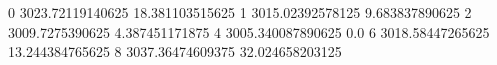 0 3023.72119140625 18.381103515625
1 3015.02392578125 9.683837890625
2 3009.7275390625 4.387451171875
4 3005.340087890625 0.0
6 3018.58447265625 13.244384765625
8 3037.36474609375 32.024658203125
